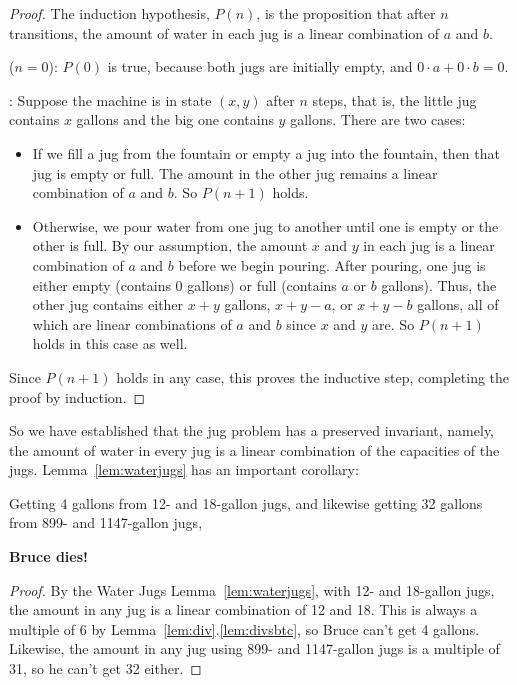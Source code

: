 \begin{proof}
The induction hypothesis, $P(n)$, is the proposition that after $n$
transitions, the amount of water in each jug is a linear combination
of $a$ and $b$.

 ($n = 0$): $P(0)$ is true, because both jugs are initially empty,
and $0 \cdot a + 0 \cdot b = 0$.

: Suppose the machine is in state
$(x,y)$ after $n$ steps, that is, the little jug contains $x$ gallons
and the big one contains $y$ gallons.  There are two cases:

\begin{itemize}

\item If we fill a jug from the fountain or empty a jug into the
  fountain, then that jug is empty or full.  The amount in the other
  jug remains a linear combination of $a$ and $b$.  So $P(n+1)$ holds.

\item Otherwise, we pour water from one jug to another until one is
  empty or the other is full.  By our assumption, the amount $x$ and
  $y$ in each jug is a linear combination of $a$ and $b$ before we
  begin pouring.  After pouring, one jug is either empty (contains 0
  gallons) or full (contains $a$ or $b$ gallons).  Thus, the other jug
  contains either $x + y$ gallons, $x + y - a$, or $x + y - b$
  gallons, all of which are linear combinations of $a$ and $b$ since
  $x$ and $y$ are.  So $P(n+1)$ holds in this case as well.
\end{itemize}
Since $P(n+1)$ holds in any case, this proves the inductive step, completing the proof by
induction.
\end{proof}

So we have established that the jug problem has a preserved invariant,
namely, the amount of water in every jug is a linear combination of
the capacities of the jugs.  Lemma~\ref{lem:waterjugs} has an
important corollary:
\begin{corollary*}
Getting 4 gallons from 12- and 18-gallon jugs, and likewise getting 32
gallons from 899- and 1147-gallon jugs,
\begin{center}
\textbf{Bruce dies!}
\end{center}
\end{corollary*}

\begin{proof}
By the Water Jugs Lemma~\ref{lem:waterjugs}, with 12- and 18-gallon
jugs, the amount in any jug is a linear combination of 12 and 18.
This is always a multiple of 6 by
Lemma~\ref{lem:div}.\ref{lem:divsbtc}, so Bruce can't get 4 gallons.
Likewise, the amount in any jug using 899- and 1147-gallon jugs is a
multiple of 31, so he can't get 32 either.
\end{proof}

